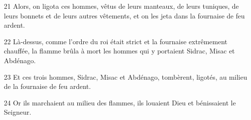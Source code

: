 
21 Alors, on ligota ces hommes, vêtus de leurs manteaux, de leurs tuniques, de leurs bonnets et de leurs autres vêtements, et on les jeta dans la fournaise de feu ardent.

22 Là-dessus, comme l’ordre du roi était strict et la fournaise extrêmement chauffée, la flamme brûla à mort les hommes qui y portaient Sidrac, Misac et Abdénago.

23 Et ces trois hommes, Sidrac, Misac et Abdénago, tombèrent, ligotés, au milieu de la fournaise de feu ardent.

24 Or ils marchaient au milieu des flammes, ils louaient Dieu et bénissaient le Seigneur.
